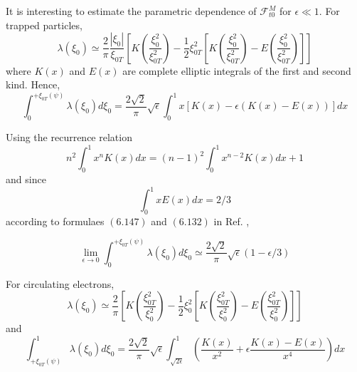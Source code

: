 It is interesting to estimate the parametric dependence of $\mathcal{F}
_{t0}^{M}$ for $\epsilon\ll1.$ For trapped particles,
\begin{equation}
\lambda\left( \xi_{0}\right) \simeq\frac{2}{\pi}\frac{\left| \xi _{0}\right|
}{\xi_{0T}}\left[ K\left( \frac{\xi_{0}^{2}}{\xi_{0T}^{2}} \right) -\frac{1}{
2}\xi_{0T}^{2}\left[ K\left( \frac{\xi_{0}^{2}}{\xi _{0T}^{2}}\right)
-E\left( \frac{\xi_{0}^{2}}{\xi_{0T}^{2}}\right) \right] \right]
\end{equation}
where $K\left( x\right) $ and $E\left( x\right) $ are complete elliptic
integrals of the first and second kind. Hence,
\begin{equation}
\int_{0}^{+\xi_{0T}\left( \psi\right) }\lambda\left( \xi_{0}\right) d\xi_{0}=%
\frac{2\sqrt{2}}{\pi}\sqrt{\epsilon}\int_{0}^{1}x\left[ K\left( x\right)
-\epsilon\left( K\left( x\right) -E\left( x\right) \right) \right] dx
\end{equation}

Using the recurrence relation
\begin{equation}
n^{2}\int_{0}^{1}x^{n}K\left( x\right) dx=\left( n-1\right) ^{2}\int
_{0}^{1}x^{n-2}K\left( x\right) dx+1
\end{equation}
and since
\begin{equation}
\int_{0}^{1}xE\left( x\right) dx=2/3
\end{equation}
according to formulaes $(6.147)$ and $\left( 6.132\right) $ in Ref. \cite
{gra65},

\begin{equation}
\lim_{\epsilon\rightarrow0}\int_{0}^{+\xi_{0T}\left( \psi\right)
}\lambda\left( \xi_{0}\right) d\xi_{0}\simeq\frac{2\sqrt{2}}{\pi}\sqrt{
\epsilon}\left( 1-\epsilon/3\right)
\end{equation}

For circulating electrons,
\begin{equation}
\lambda\left( \xi_{0}\right) \simeq\frac{2}{\pi}\left[ K\left( \frac
{\xi_{0T}^{2}}{\xi_{0}^{2}}\right) -\frac{1}{2}\xi_{0}^{2}\left[ K\left(
\frac{\xi_{0T}^{2}}{\xi_{0}^{2}}\right) -E\left( \frac{\xi_{0T}^{2}}{\xi
_{0}^{2}}\right) \right] \right]
\end{equation}
and
\begin{equation}
\int_{+\xi_{0T}\left( \psi\right) }^{1}\lambda\left( \xi_{0}\right) d\xi_{0}=%
\frac{2\sqrt{2}}{\pi}\sqrt{\epsilon}\int_{\sqrt{2\epsilon} }^{1}\left( \frac{
K\left( x\right) }{x^{2}}+\epsilon\frac{K\left( x\right) -E\left( x\right) }{
x^{4}}\right) dx
\end{equation}

